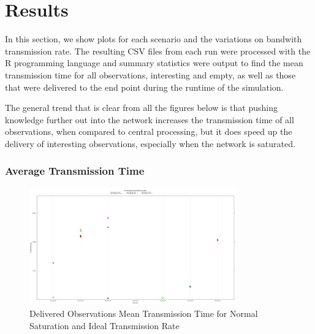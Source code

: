 \section{Results}\label{sim:res}
In this section, we show plots for each scenario and the variations on bandwith transmission rate. The resulting CSV files from each run were processed with the R programming language \cite{rlang} and summary statistics were output to find the mean transmission time for all observations, interesting and empty, as well as those that were delivered to the end point during the runtime of the simulation.

The general trend that is clear from all the figures below is that pushing knowledge further out into the network increases the transmission time of all observations, when compared to central processing, but it does speed up the delivery of interesting observations, especially when the network is saturated. 

\subsubsection{Average Transmission Time}

	\begin{figure}[H]
	\centering
	\includegraphics[width=0.8\textwidth]{Chap7/figures/plots/normal_ideal/delivered_mean.png}
	\caption{Delivered Observations Mean Transmission Time for Normal Saturation and Ideal Transmission Rate}
	\label{fig:sim:res:norm:ideal:delmean}
	\end{figure}

